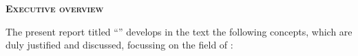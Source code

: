 % 
% 
% 

\newpage
\thispagestyle{empty}

\clearpage
\cleardoublepage
{}

\pagestyle{plain}

{}

{\noindent \textbf{\textsc{Executive overview}}}

\noindent The present {\thesisType} report titled ``{\thesisTitle}'' develops in the text the following concepts, which are duly justified and discussed, focussing on the field of {\thesisArea}:


\vspace*{5mm}


